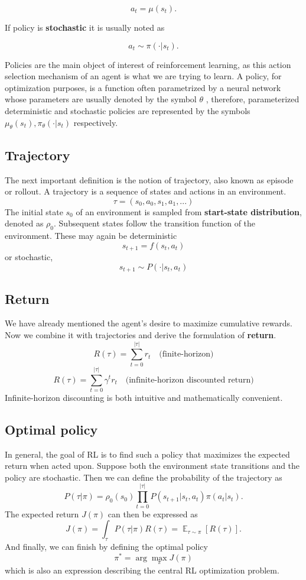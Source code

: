 $$
a_t = \mu(s_t).
$$

If policy is \textbf{stochastic} it is usually noted as 

$$a_t \sim \pi(\cdot |s_t).$$

Policies are the main object of interest of reinforcement learning, as this action selection mechanism of an agent is what we are trying to learn.
A policy, for optimization purposes, is a function often parametrized by a neural network whose parameters are usually denoted by the symbol
$
    \theta
$
, therefore, parameterized deterministic and stochastic policies are represented by the symbols     $\mu_\theta(s_t) , \pi_\theta(\cdot |s_t)$ respectively.

\subsection*{Trajectory}
The next important definition is the notion of trajectory, also known as episode or rollout.
A trajectory is a sequence of states and actions in an environment.
$$\tau = (s_0, a_0, s_1, a_1, ...)$$
The initial state $s_0$ of an environment is sampled from \textbf{start-state distribution}, denoted as $\rho_0$. 
Subsequent states follow the transition function of the environment. 
These may again be deterministic 
$$s_{t+1} = f(s_t, a_t)$$ or stochastic,
$$s_{t+1} \sim P(\cdot | s_t, a_t)$$

\subsection*{Return}
We have already mentioned the agent's desire to maximize cumulative rewards.
Now we combine it with trajectories and derive the formulation of \textbf{return}.
$$R(\tau) = \sum_{t=0}^{|\tau|}r_t \quad \textrm{(finite-horizon)} $$
$$R(\tau) = \sum_{t=0}^{|\tau|}\gamma^t r_t \quad \textrm{(infinite-horizon discounted return)} $$
Infinite-horizon discounting is both intuitive and mathematically convenient.



\subsection*{Optimal policy}
In general, the goal of RL is to find such a policy that maximizes the expected return when acted upon.
Suppose both the environment state transitions and the policy are stochastic. 
Then we can define the probability of the trajectory as
$$P(\tau|\pi) = \rho_0(s_0) \prod_{t=0}^{|\tau|} P(s_{t+1}|s_t,a_t)\pi(a_t|s_t).$$
The expected return $J(\pi)$ can then be expressed as
$$J(\pi)=\int_\tau P(\tau|\pi)R(\tau)= \mathop{\mathbb{E}}_{\tau \sim \pi}[R(\tau)].$$
And finally, we can finish by defining the optimal policy 
$$\pi^* = \arg \max_\pi J(\pi)$$
which is also an expression describing the central RL optimization problem.

